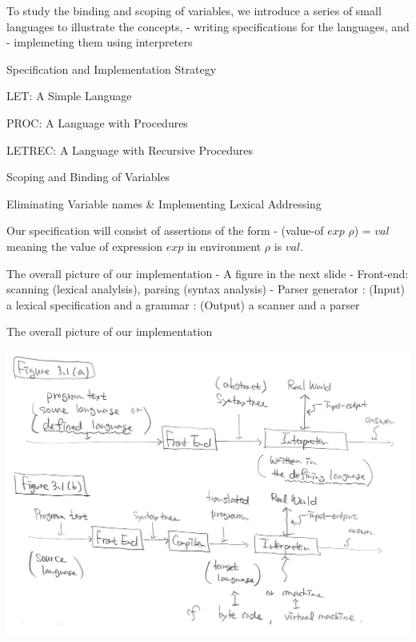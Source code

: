 \documentclass{article}
\begin{document}
\begin{huge}

\sf



To study the binding and scoping of variables, we introduce a series of small languages to illustrate the concepts, \al
- writing specifications for the languages, and \al
- implemeting them using interpreters

\blob Specification and Implementation Strategy

\blob LET: A Simple Language

\blob PROC: A Language with Procedures

\blob LETREC: A Language with Recursive Procedures

\blob Scoping and Binding of Variables

\blob Eliminating Variable names \& Implementing Lexical Addressing


Our specification will consist of assertions of the form \al
- (value-of $exp$ $\rho$) = $val$ \al
meaning the value of expression $exp$ in environment $\rho$ is $val$.

The overall picture of our implementation \al
- A figure in the next slide \al
- Front-end: scanning (lexical analylsis), parsing (syntax analysis) \al
- Parser generator \al
  : (Input) a lexical specification and a grammar \al
  : (Output) a scanner and a parser


The overall picture of our implementation

\includegraphics[width=0.85\linewidth]{fig_3_1_lang_proc_system}


\end{huge}
\end{document}
